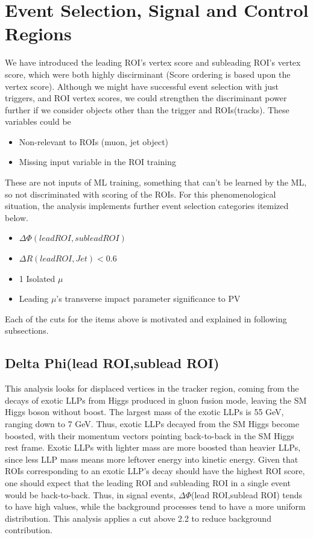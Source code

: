 \clearpage
\chapter{Event Selection, Signal and Control Regions}\label{sec:selections}
We have introduced the leading ROI's vertex score and subleading ROI's vertex score, which were both highly discirminant (Score ordering is based upon the vertex score).
Although we might have successful event selection with just triggers, and ROI vertex scores, we could strengthen the discriminant power further if we consider objects other than the trigger and ROIs(tracks).
These variables could be
\begin{itemize}
 \item Non-relevant to ROIs (muon, jet object)
 \item Missing input variable in the ROI training
\end{itemize}
These are not inputs of ML training, something that can't be learned by the ML, so not discriminated with scoring of the ROIs.
For this phenomenological situation, the analysis implements further event selection categories itemized below.
\begin{itemize}
  \item $\Delta\Phi(lead ROI,sublead ROI)$ 
  \item $\Delta R(lead ROI, Jet)<$0.6 
  \item 1 Isolated $\mu$
  \item Leading $\mu$'s transverse impact parameter significance to PV
\end{itemize}

Each of the cuts for the items above is motivated and explained in following subsections.

\section{Delta Phi(lead ROI,sublead ROI)}\label{sec:DeltaPhi}
This analysis looks for displaced vertices in the tracker region, coming from the decays of exotic LLPs from Higgs produced in gluon fusion mode, leaving the SM Higgs boson without boost.
The largest mass of the exotic LLPs is 55 GeV, ranging down to 7 GeV. 
Thus, exotic LLPs decayed from the SM Higgs become boosted, with their momentum vectors pointing back-to-back in the SM Higgs rest frame. 
Exotic LLPs with lighter mass are more boosted than heavier LLPs, since less LLP mass means more leftover energy into kinetic energy.
Given that ROIs corresponding to an exotic LLP's decay should have the highest ROI score, one should expect that the leading ROI and subleading ROI in a single event would be back-to-back.
Thus, in signal events, $\Delta\Phi$(lead ROI,sublead ROI) tends to have high values, while the background processes tend to have a more uniform distribution.
This analysis applies a cut above 2.2 to reduce background contribution. 


